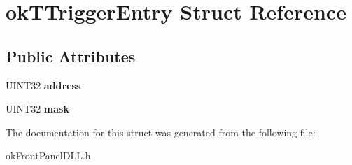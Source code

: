 \hypertarget{structokTTriggerEntry}{\section{ok\+T\+Trigger\+Entry Struct Reference}
\label{structokTTriggerEntry}
}
\subsection*{Public Attributes}
\begin{DoxyCompactItemize}
\item 
\hypertarget{structokTTriggerEntry_ac6b4319021b2d5560aa17cc76e6dabac}{U\+I\+N\+T32 {\bfseries address}}\label{structokTTriggerEntry_ac6b4319021b2d5560aa17cc76e6dabac}

\item 
\hypertarget{structokTTriggerEntry_a9dace8dfc94bb9abd1035a5d6ef04204}{U\+I\+N\+T32 {\bfseries mask}}\label{structokTTriggerEntry_a9dace8dfc94bb9abd1035a5d6ef04204}

\end{DoxyCompactItemize}


The documentation for this struct was generated from the following file\+:\begin{DoxyCompactItemize}
\item 
ok\+Front\+Panel\+D\+L\+L.\+h\end{DoxyCompactItemize}
